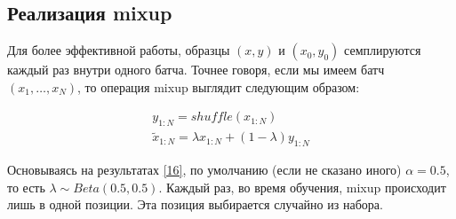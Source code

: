 \subsection{Реализация mixup}
Для более эффективной работы, образцы $(x, y)$ и $(x_0, y_0)$ семплируются каждый раз внутри одного батча. Точнее говоря, если мы имеем батч $(x_1, \dots, x_N)$, то операция mixup выглядит следующим образом:

\begin{equation}
\begin{split}
y_{1:N} = shuffle(x_{1:N}) \\
\tilde{x}_{1:N} = \lambda x_{1:N} + (1 - \lambda) y_{1:N}
\end{split}
\end{equation}

Основываясь на результатах \hyperlink{cite.Bas19}{[16]}, по умолчанию (если не сказано иного) $\alpha = 0.5$, то есть $\lambda \sim Beta(0.5, 0.5)$. Каждый раз, во время обучения, mixup происходит лишь в одной позиции. Эта позиция выбирается случайно из набора.



\newpage